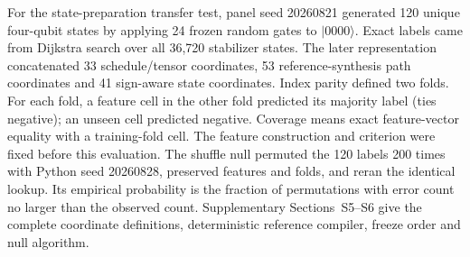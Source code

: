 For the state-preparation transfer test, panel seed 20260821 generated 120 unique four-qubit states by applying 24 frozen random gates to $|0000\rangle$.  Exact labels came from Dijkstra search over all 36,720 stabilizer states.  The later representation concatenated 33 schedule/tensor coordinates, 53 reference-synthesis path coordinates and 41 sign-aware state coordinates.  Index parity defined two folds.  For each fold, a feature cell in the other fold predicted its majority label (ties negative); an unseen cell predicted negative.  Coverage means exact feature-vector equality with a training-fold cell.  The feature construction and criterion were fixed before this evaluation.  The shuffle null permuted the 120 labels 200 times with Python seed 20260828, preserved features and folds, and reran the identical lookup.  Its empirical probability is the fraction of permutations with error count no larger than the observed count.  Supplementary Sections~S5--S6 give the complete coordinate definitions, deterministic reference compiler, freeze order and null algorithm.
